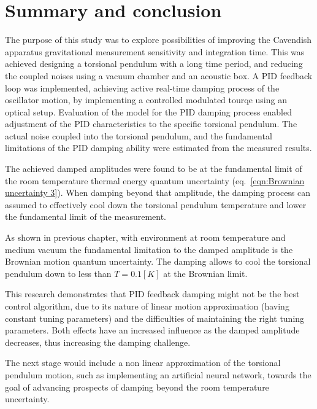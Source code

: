 \documentclass[\main/master.tex]{subfiles}
\begin{document}
\newspacing
\chapter{Summary and conclusion}\label{chapter:Summary and conclusion}
The purpose of this study was to explore possibilities of improving the Cavendish apparatus gravitational measurement sensitivity and integration time. This was achieved designing a torsional pendulum with a long time period, and reducing the coupled noises  using a vacuum chamber and an acoustic box. A PID feedback loop was implemented, achieving active real-time damping process of the oscillator motion, by implementing a controlled modulated tourqe using an optical setup. Evaluation of the model for the PID damping process enabled adjustment of the PID characteristics to the specific torsional pendulum. The actual noise coupled into the torsional pendulum, and the fundamental limitations of the PID damping ability were estimated from the measured results.
\par\noindent
The achieved damped amplitudes were found to be at the fundamental limit of the room temperature thermal energy quantum uncertainty (eq.~\ref{eqn:Brownian uncertainty 3}). When damping beyond that amplitude, the damping process can assumed to effectively cool down the torsional pendulum temperature and lower the fundamental limit of the measurement. 
\par\noindent
As shown in previous chapter, with environment at room temperature and medium vacuum the fundamental limitation to the damped amplitude is the Brownian motion quantum uncertainty. The damping allows to cool the torsional pendulum down to less than $T=0.1[K]$ at the Brownian limit.
\par\noindent
This research demonstrates that PID feedback damping might not be the best control algorithm, due to its nature of linear motion approximation (having constant tuning parameters) and the difficulties of maintaining the right tuning parameters. Both effects have an increased influence as the damped amplitude decreases, thus increasing the damping challenge.
\par\noindent
The next stage would include a non linear approximation of the torsional pendulum motion, such as implementing an artificial neural network, towards the goal of advancing prospects of damping beyond the room temperature uncertainty. 
\end{document}
